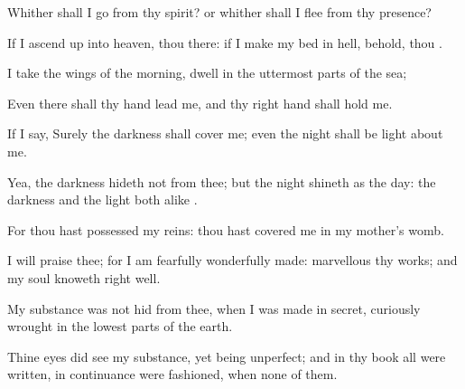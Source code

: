 {\Q {}Whither shall I
go from thy
spirit? or whither shall I
flee from thy
presence?


\par }{\Q {}If I ascend
up into
heaven, thou
{} there: if I make my
bed in
hell, behold, thou
{}.


\par }{\Q {} I
take the
wings of the
morning,
{}
dwell in the uttermost
parts of the
sea;


\par }{\Q {}Even there shall thy
hand
lead me, and thy right
hand shall
hold me.


\par }{\Q {}If I
say, Surely the
darkness shall
cover me; even the
night shall be
light about
me.


\par }{\Q {}Yea, the
darkness
hideth not from thee; but the
night
shineth as the
day: the
darkness and the
light
{} both alike
{}.


\par }{\Q {}For thou hast
possessed my
reins: thou hast
covered me in my
mother’s
womb.


\par }{\Q {}I will
praise thee; for I am
fearfully
{} wonderfully
made:
marvellous
{} thy
works; and
{} my
soul
knoweth right
well.


\par }{\Q {}My
substance was not
hid from thee, when I was
made in
secret,
{} curiously
wrought in the lowest
parts of the
earth.


\par }{\Q {}Thine
eyes did
see my substance, yet being
unperfect; and in thy
book all
{} were
written,
{} in
continuance were
fashioned, when
{}
none of them.


\par }{\BB \par }

